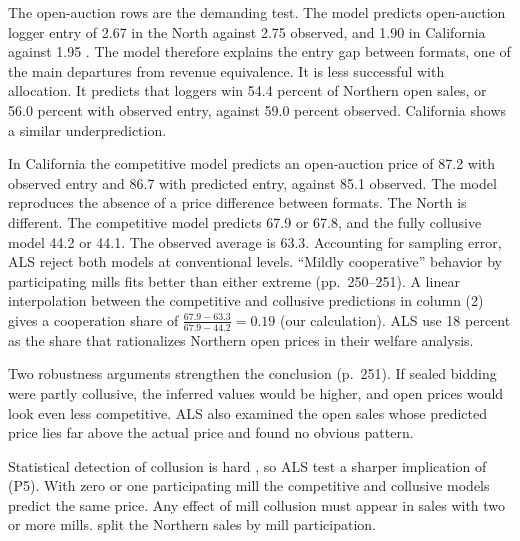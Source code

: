 The open-auction rows are the demanding test. The model predicts open-auction logger entry of 2.67 in the
North against 2.75 observed, and 1.90 in California against 1.95 \citep[p.~250]{AtheyLevinSeira2011}. The
model therefore explains the entry gap between formats, one of the main departures from revenue
equivalence. It is less successful with allocation. It predicts that loggers win 54.4 percent of Northern
open sales, or 56.0 percent with observed entry, against 59.0 percent observed. California shows a similar
underprediction.

In California the competitive model predicts an open-auction price of 87.2 with observed entry and 86.7
with predicted entry, against 85.1 observed. The model reproduces the absence of a price difference between
formats. The North is different. The competitive model predicts 67.9 or 67.8, and the fully collusive model
44.2 or 44.1. The observed average is 63.3. Accounting for sampling error, ALS reject both models at
conventional levels. ``Mildly cooperative'' behavior by participating mills fits better than either extreme
(pp.~250--251). A linear interpolation between the competitive and collusive predictions in column (2)
gives a cooperation share of $\frac{67.9-63.3}{67.9-44.2}=0.19$ (our calculation). ALS use 18 percent as the
share that rationalizes Northern open prices in their welfare analysis.

Two robustness arguments strengthen the conclusion (p.~251). If sealed bidding were partly collusive, the
inferred values would be higher, and open prices would look even less competitive. ALS also examined the
open sales whose predicted price lies far above the actual price and found no obvious pattern.

Statistical detection of collusion is hard \citep{BajariYe2003}, so ALS test a sharper implication of
(P5). With zero or one participating mill the competitive and collusive models predict the same price.
Any effect of mill collusion must appear in sales with two or more mills.
 split the Northern sales by mill participation.

